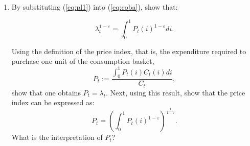 \documentclass[dvipsnames,11pt]{article}
\begin{document}
\begin{enumerate}
\begin{solution}
Next, consider two goods \( i \neq j \).
From the demand schedule,
\[
C_t(i)=\left(\frac{P_t(i)}{\lambda_t}\right)^{-\varepsilon} C_t,
\qquad
C_t(j)=\left(\frac{P_t(j)}{\lambda_t}\right)^{-\varepsilon} C_t.
\]
The ratio is
\begin{align*}
\frac{C_t(i)}{C_t(j)}
&=
\frac{\left(\frac{P_t(i)}{\lambda_t}\right)^{-\varepsilon} C_t}
{\left(\frac{P_t(j)}{\lambda_t}\right)^{-\varepsilon} C_t} \\
&= 
\left(\frac{P_t(i)}{P_t(j)}\right)^{-\varepsilon} \\
&=
\left(\frac{P_t(j)}{P_t(i)}\right)^{\varepsilon}.
\end{align*}
Using the definition of elasticity,
\begin{align*}
\varepsilon_{ij}
& =
\frac{\partial \left( \frac{C_t(i)}{C_t(j)} \right)}
{\partial \left( \frac{P_t(j)}{P_t(i)} \right)}
\cdot
\frac{P_t(j)/P_t(i)}{C_t(i)/C_t(j)} \\
& = \varepsilon \cdot \left(\frac{P_t(j)}{P_t(i)} \right)^{\varepsilon - 1} \cdot \frac{P_t(j)/ P_t(i)}{\left(P_t(j)/ P_t(i)\right)^\varepsilon}
\\
& = \varepsilon \cdot \left(\frac{P_t(j)}{P_t(i)} \right)^{\varepsilon - 1 + 1 - \varepsilon} \\
& = \varepsilon.
\end{align*}

Hence, the elasticity of substitution between any two goods is constant and equal to \( \varepsilon \).

As \( \varepsilon \) increases, goods become closer substitutes: households respond more strongly to relative price changes, reallocating consumption more aggressively toward cheaper goods.

\end{solution}
    
            \item By substituting (\ref{eq:pl1}) into (\ref{eq:coba}), show that: 

            \begin{equation}\label{lambda_t^}
                \lambda_t^{1-\varepsilon} = \int_0^1P_t(i)^{1-\varepsilon}di.
            \end{equation}
            
            Using the definition of the price index, that is, the expenditure required to purchase one unit of the consumption basket,
            \begin{equation}\label{P_t}
                P_{t} := \frac{\int_{0}^{1}P_{t}(i)C_t(i)di}{C_t},
            \end{equation}
            show that one obtains $P_t= \lambda_t$. Next, using this result, show that the price index can be expressed as: 
            \begin{equation}\label{P_t (i)}
                P_{t} = \left( \int_0^1P_t(i)^{1-\varepsilon}  \right)^{\frac{1}{1-\varepsilon}}.
            \end{equation}
            What is the interpretation of $P_t$?


\end{enumerate}
\end{document}
